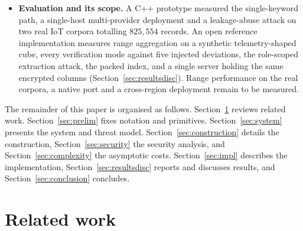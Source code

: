 \documentclass[a4paper,fleqn]{cas-sc}
\begin{document}
\begin{itemize}
\item \textbf{Evaluation and its scope.} A C++ prototype measured the
single-keyword path, a single-host multi-provider deployment and a
leakage-abuse attack on two real IoT corpora totalling $825{,}554$ records.
An open reference implementation measures range aggregation on a synthetic
telemetry-shaped cube, every verification mode against five injected
deviations, the role-scoped extraction attack, the packed index, and a single
server holding the same encrypted columns (Section~\ref{sec:resultsdisc}).
Range performance on the real corpora, a native port and a cross-region
deployment remain to be measured.
\end{itemize}

The remainder of this paper is organised as follows.
Section~\ref{sec:related} reviews related work. Section~\ref{sec:prelim} fixes
notation and primitives. Section~\ref{sec:system} presents the system and
threat model. Section~\ref{sec:construction} details
the construction, Section~\ref{sec:security} the security analysis, and
Section~\ref{sec:complexity} the asymptotic costs. Section~\ref{sec:impl}
describes the implementation, Section~\ref{sec:resultsdisc} reports and
discusses results, and Section~\ref{sec:conclusion} concludes.

\section{Related work}
\label{sec:related}
\end{document}
